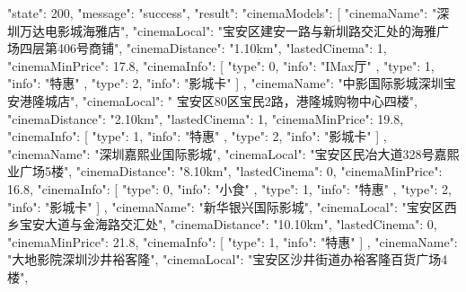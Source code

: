 {
    "state": 200,
    "message": "success",
    "result": {
        "cinemaModels": [
            {
                "cinemaName": "深圳万达电影城海雅店",
                "cinemaLocal": "宝安区建安一路与新圳路交汇处的海雅广场四层第406号商铺",
                "cinemaDistance": "1.10km",
                "lastedCinema": 1,
                "cinemaMinPrice": 17.8,
                "cinemaInfo": [
                    {
                        "type": 0,
                        "info": "IMax厅"
                    },
                    {
                        "type": 1,
                        "info": "特惠"
                    },
                    {
                        "type": 2,
                        "info": "影城卡"
                    }
                ]
            },
            {
                "cinemaName": "中影国际影城深圳宝安港隆城店",
                "cinemaLocal": " 宝安区80区宝民2路，港隆城购物中心四楼",
                "cinemaDistance": "2.10km",
                "lastedCinema": 1,
                "cinemaMinPrice": 19.8,
                "cinemaInfo": [
                    {
                        "type": 1,
                        "info": "特惠"
                    },
                    {
                        "type": 2,
                        "info": "影城卡"
                    }
                ]
            },
            {
                "cinemaName": "深圳嘉熙业国际影城",
                "cinemaLocal": "宝安区民冶大道328号嘉熙业广场5楼",
                "cinemaDistance": "8.10km",
                "lastedCinema": 0,
                "cinemaMinPrice": 16.8,
                "cinemaInfo": [
                    {
                        "type": 0,
                        "info": "小食"
                    },
                    {
                        "type": 1,
                        "info": "特惠"
                    },
                    {
                        "type": 2,
                        "info": "影城卡"
                    }
                ]
            },
            {
                "cinemaName": "新华银兴国际影城",
                "cinemaLocal": "宝安区西乡宝安大道与金海路交汇处",
                "cinemaDistance": "10.10km",
                "lastedCinema": 0,
                "cinemaMinPrice": 21.8,
                "cinemaInfo": [
                    {
                        "type": 1,
                        "info": "特惠"
                    }
                ]
            },
            {
                "cinemaName": "大地影院深圳沙井裕客隆",
                "cinemaLocal": "宝安区沙井街道办裕客隆百货广场4楼",
}}}
